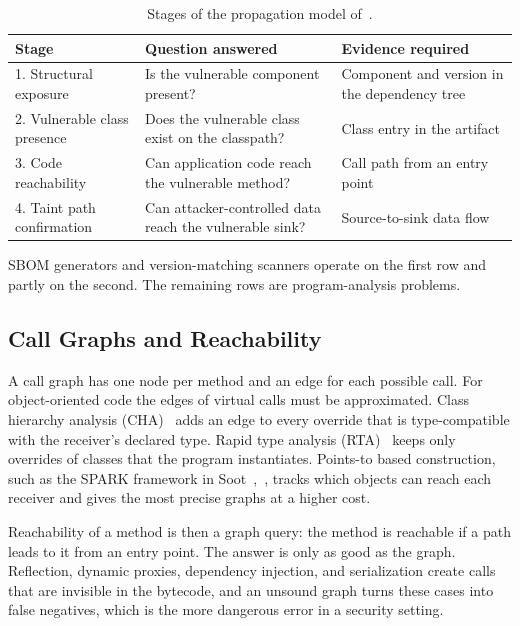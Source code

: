 \documentclass[conference]{IEEEtran}
\begin{document}
\begin{table}[t]
\caption{Stages of the propagation model of~\cite{grgic}.}
\label{tab:stages}
\centering
\footnotesize
\renewcommand{\arraystretch}{1.15}
\setlength{\tabcolsep}{2.5pt}
\begin{tabular}{@{}p{0.9in}p{1.15in}p{1.2in}@{}}
\toprule
Stage & Question answered & Evidence required \\
\midrule
1. Structural exposure & Is the vulnerable component present? & Component and version in the dependency tree \\
2. Vulnerable class presence & Does the vulnerable class exist on the classpath? & Class entry in the artifact \\
3. Code reachability & Can application code reach the vulnerable method? & Call path from an entry point \\
4. Taint path confirmation & Can attacker-controlled data reach the vulnerable sink? & Source-to-sink data flow \\
\bottomrule
\end{tabular}
\end{table}

SBOM generators and version-matching scanners operate on the first row and partly on the second. The remaining rows are program-analysis problems.

\subsection{Call Graphs and Reachability}
A call graph has one node per method and an edge for each possible call. For object-oriented code the edges of virtual calls must be approximated. Class hierarchy analysis (CHA)~\cite{cha} adds an edge to every override that is type-compatible with the receiver's declared type. Rapid type analysis (RTA)~\cite{rta} keeps only overrides of classes that the program instantiates. Points-to based construction, such as the SPARK framework in Soot~\cite{soot},~\cite{spark}, tracks which objects can reach each receiver and gives the most precise graphs at a higher cost.

Reachability of a method is then a graph query: the method is reachable if a path leads to it from an entry point. The answer is only as good as the graph. Reflection, dynamic proxies, dependency injection, and serialization create calls that are invisible in the bytecode, and an unsound graph turns these cases into false negatives, which is the more dangerous error in a security setting.
\end{document}
